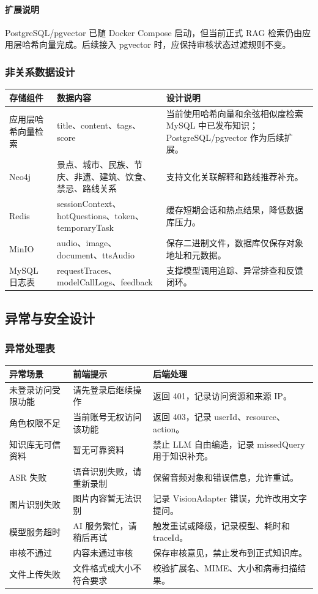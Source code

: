 \paragraph{扩展说明}
PostgreSQL/pgvector 已随 Docker Compose 启动，但当前正式 RAG 检索仍由应用层哈希向量完成。后续接入 pgvector 时，应保持审核状态过滤规则不变。

\subsubsection{非关系数据设计}

\begin{longtable}{p{2.8cm}p{3.7cm}p{6.7cm}}
\toprule
存储组件 & 数据内容 & 设计说明 \\
\midrule
应用层哈希向量检索 & title、content、tags、score & 当前使用哈希向量和余弦相似度检索 MySQL 中已发布知识；PostgreSQL/pgvector 作为后续扩展。 \\
Neo4j & 景点、城市、民族、节庆、非遗、建筑、饮食、禁忌、路线关系 & 支持文化关联解释和路线推荐补充。 \\
Redis & sessionContext、hotQuestions、token、temporaryTask & 缓存短期会话和热点结果，降低数据库压力。 \\
MinIO & audio、image、document、ttsAudio & 保存二进制文件，数据库仅保存对象地址和元数据。 \\
MySQL 日志表 & requestTraces、modelCallLogs、feedback & 支撑模型调用追踪、异常排查和反馈闭环。 \\
\bottomrule
\end{longtable}

\subsection{异常与安全设计}

\subsubsection{异常处理表}

\begin{longtable}{p{3.3cm}p{4.2cm}p{5.4cm}}
\toprule
异常场景 & 前端提示 & 后端处理 \\
\midrule
未登录访问受限功能 & 请先登录后继续操作 & 返回 401，记录访问资源和来源 IP。 \\
角色权限不足 & 当前账号无权访问该功能 & 返回 403，记录 userId、resource、action。 \\
知识库无可信资料 & 暂无可靠资料 & 禁止 LLM 自由编造，记录 missedQuery 用于知识补充。 \\
ASR 失败 & 语音识别失败，请重新录制 & 保留音频对象和错误信息，允许重试。 \\
图片识别失败 & 图片内容暂无法识别 & 记录 VisionAdapter 错误，允许改用文字提问。 \\
模型服务超时 & AI 服务繁忙，请稍后再试 & 触发重试或降级，记录模型、耗时和 traceId。 \\
审核不通过 & 内容未通过审核 & 保存审核意见，禁止发布到正式知识库。 \\
文件上传失败 & 文件格式或大小不符合要求 & 校验扩展名、MIME、大小和病毒扫描结果。 \\
\bottomrule
\end{longtable}


